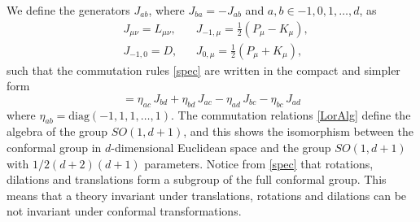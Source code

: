 \documentclass[a4paper,11pt,openright,twoside]{book}
\numberwithin{equation}{section}
\begin{document}
We define the generators $J_{ab}$, where $J_{ba}=-J_{ab}$ and $a,b\in {-1,0,1,\dots,d}$, as 
\begin{equation}
	\begin{aligned}
		&J_{\mu\nu}=L_{\mu\nu},&& J_{-1,\mu}=\frac{1}{2}\left(P_\mu-K_\mu\right),\\
		&J_{-1,0}=D,&& J_{0,\mu}=\frac{1}{2}\left(P_\mu+K_\mu\right),
	\end{aligned}
\end{equation}
such that the commutation rules \eqref{spec} are written in the compact and simpler form
\begin{equation}
	[J_{ab},J_{cd}]=\eta_{ac}\,J_{bd}+\eta_{bd}\,J_{ac}-\eta_{ad}\,J_{bc}-\eta_{bc}\,J_{ad}\label{LorAlg}
\end{equation}
where $\eta_{ab}=\text{diag}(-1,1,1,\dots,1)$. The commutation relations \eqref{LorAlg} define the algebra of the group $SO(1,d+1)$, and this shows the isomorphism between the conformal group in $d$-dimensional Euclidean space and the group $SO(1,d+1)$ with $1/2(d+2)(d+1)$ parameters.  
Notice from \eqref{spec} that rotations, dilations and translations form a subgroup of the full conformal group. This means that a theory invariant under translations, rotations and dilations can be not invariant under conformal transformations. 
\end{document}
